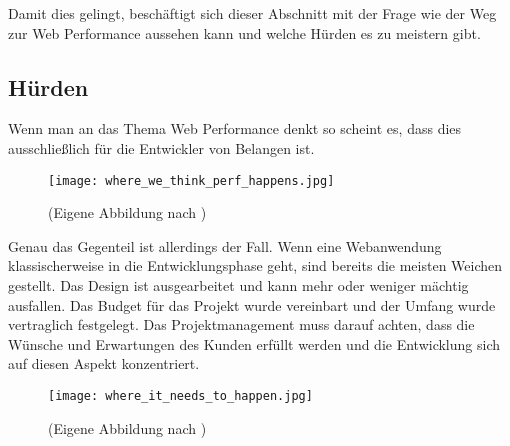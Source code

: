 	Damit dies gelingt, beschäftigt sich dieser Abschnitt mit der Frage wie der Weg zur Web Performance aussehen kann und welche Hürden es zu meistern gibt.

	\subsection{Hürden} %
	\label{sub:hürden}
	
	Wenn man an das Thema Web Performance denkt so scheint es, dass dies ausschließlich für die Entwickler von Belangen ist.
	
	\begin{figure}[htbp]
		\begin{center}
			\texttt{[image: where\_we\_think\_perf\_happens.jpg]}
			\caption{(Eigene Abbildung nach \autocite[p. 10]{kovalcin15})}
			\label{fig:where_we_think_perf_happens}
		\end{center}
	\end{figure}

	Genau das Gegenteil ist allerdings der Fall. Wenn eine Webanwendung klassischerweise in die Entwicklungsphase geht, sind bereits die meisten Weichen gestellt. Das Design ist ausgearbeitet und kann mehr oder weniger mächtig ausfallen. Das Budget für das Projekt wurde vereinbart und der Umfang wurde vertraglich festgelegt. Das Projektmanagement muss darauf achten, dass die Wünsche und Erwartungen des Kunden erfüllt werden und die Entwicklung sich auf diesen Aspekt konzentriert.

	\begin{figure}[htbp]
		\begin{center}
			\texttt{[image: where\_it\_needs\_to\_happen.jpg]}
			\caption{(Eigene Abbildung nach \autocite[p. 11]{kovalcin15})}
			\label{fig:where_it_needs_to_happen}
		\end{center}
	\end{figure}

